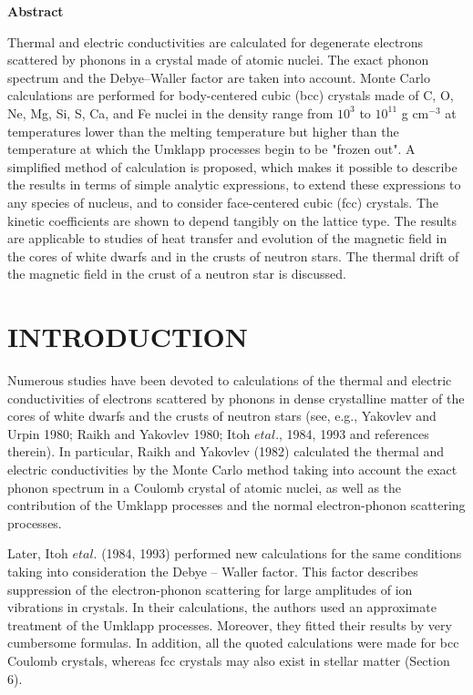 
\begin{center}
                        {\bf Abstract}
\end{center}

Thermal and electric conductivities are calculated
for degenerate electrons scattered by phonons in a crystal made
of atomic nuclei. The exact phonon spectrum and the
Debye--Waller factor are taken into account.
Monte Carlo calculations are performed for body-centered cubic (bcc)
crystals made of C, O, Ne, Mg, Si, S, Ca, and Fe nuclei
in the density range from $10^3$ to $10^{11}$ g cm$^{-3}$
at temperatures lower than the 
melting temperature but higher than the temperature at which the Umklapp
processes begin to be "frozen out". A simplified method of calculation
is proposed, which makes it possible to describe the results in
terms of simple analytic expressions, to extend these expressions
to any species of nucleus, and to consider face-centered cubic (fcc)
crystals. The kinetic coefficients are shown to depend tangibly on the
lattice type. The results are applicable to
studies of heat transfer and evolution of the magnetic field
in the cores of white dwarfs and in the crusts of neutron stars. The
thermal drift of the magnetic field in the crust of a neutron star is
discussed. 

\newpage

\section{INTRODUCTION}
Numerous studies have been devoted to calculations of the thermal 
and electric conductivities of electrons scattered by phonons in
dense crystalline matter of the cores of white dwarfs and the
crusts of neutron stars (see, e.g., Yakovlev and Urpin 1980; Raikh
and Yakovlev 1980; Itoh $et al.$, 1984, 1993 and references
therein). In particular, Raikh  and Yakovlev (1982) calculated
the thermal and electric conductivities by the Monte Carlo method
taking into account the exact phonon spectrum in
a Coulomb crystal of atomic nuclei, as well as the contribution of
the Umklapp processes and the normal electron-phonon scattering processes.

Later, Itoh $et al.$ (1984, 1993) performed new calculations for
the same conditions taking into consideration the Debye -- Waller factor.
This factor describes suppression of the electron-phonon scattering
for large amplitudes of ion vibrations in crystals. In their
calculations, the authors used an approximate treatment of the
Umklapp processes. Moreover, they fitted their results by
very cumbersome formulas. In addition, all the
quoted calculations were made for bcc Coulomb crystals, whereas
fcc crystals may also exist in stellar matter (Section 6).

